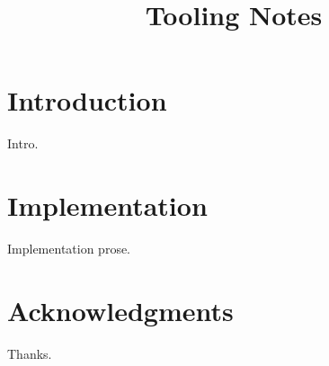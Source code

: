\documentclass[article]{jss}
\title{Tooling Notes}
\begin{document}
\section{Introduction}
Intro.
\section{Implementation}
Implementation prose.
\section*{Acknowledgments}
Thanks.

\end{document}
